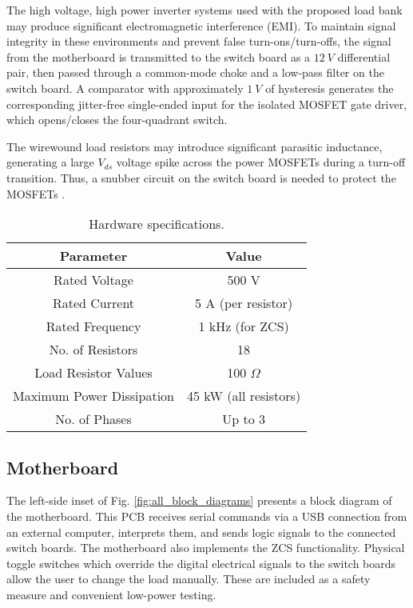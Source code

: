 \documentclass{article}
\begin{document}
The high voltage, high power inverter systems used with the proposed load bank may produce significant electromagnetic interference (EMI). To maintain signal integrity in these environments and prevent false turn-ons/turn-offs, the signal from the motherboard is transmitted to the switch board as a $12\:V$ differential pair, then passed through a common-mode choke and a low-pass filter on the switch board. A comparator with approximately $1\:V$ of hysteresis generates the corresponding jitter-free single-ended input for the isolated MOSFET gate driver, which opens/closes the four-quadrant switch.

The wirewound load resistors may introduce significant parasitic inductance, generating a large $V_{ds}$ voltage spike across the power MOSFETs during a turn-off transition. Thus, a snubber circuit on the switch board is needed to protect the MOSFETs \cite{Jackson2021_PECI}.

\begin{table}[!b]
\vspace{-0.1cm}
\centering
\caption{Hardware specifications.}
\label{tab:hardware_specs}
\begin{tabular}{cc}
\midrule
\textbf{Parameter}        & \textbf{Value}        \\
\midrule
Rated Voltage             & 500 V                 \\
Rated Current             & 5 A (per resistor)    \\
Rated Frequency           & 1 kHz (for ZCS)	      \\
No. of Resistors          & 18                    \\
Load Resistor Values      & 100 $\Omega$          \\
Maximum Power Dissipation & 45 kW (all resistors) \\
No. of Phases             & Up to 3          \\
\midrule 
\end{tabular}
\end{table}

\vspace{0.2cm}
\subsection{Motherboard}
\label{subsec:motherboard}

The left-side inset of Fig. \ref{fig:all_block_diagrams} presents a block diagram of the motherboard. This PCB receives serial commands via a USB connection from an external computer, interprets them, and sends logic signals to the connected switch boards. The motherboard also implements the ZCS functionality. Physical toggle switches which override the digital electrical signals to the switch boards allow the user to change the load manually. These are included as a safety measure and convenient low-power testing.
\end{document}
